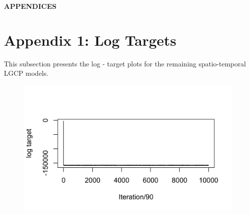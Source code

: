 \newpage


\titleformat{\section}{\normalfont\bfseries}{\thesection}{1em}{}



\begin{center}
	\MakeUppercase{\textbf{APPENDICES}}
\end{center}

{}


\section*{Appendix 1: Log Targets} \label{app:log-targets}

    This subsection presents the log - target plots for the remaining spatio-temporal LGCP models.

    \begin{figure}[H]
        \begin{center}
            \includegraphics[scale=1]{Log Target Plot - ST - Major 0.png}
        \end{center}
    \end{figure}

